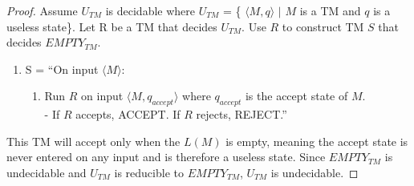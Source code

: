 \documentclass{article}
\begin{document}
\begin{proof}  
    Assume $U_{TM}$ is decidable where $U_{TM}$ = \{ $\langle M, q \rangle$  $|$ $M$ is a TM and $q$ is a useless state\}. Let R be a TM that decides $U_{TM}$. Use $R$ to construct TM $S$ that decides $EMPTY_{TM}$.
    \begin{enumerate}
    \item S = ``On input $\langle M \rangle$:
    \begin{enumerate} [1.]
    \item Run $R$ on input $\langle M, q_{accept} \rangle$ where $q_{accept}$ is the accept state of $M$.
    \\ - If $R$ accepts, ACCEPT. If $R$ rejects, REJECT.''
    \end{enumerate}
\end{enumerate}

This TM will accept only when the $L(M)$ is empty, meaning the accept state is never entered on any input and is therefore a useless state. Since $EMPTY_{TM}$ is undecidable and $U_{TM}$ is reducible to $EMPTY_{TM}$, $U_{TM}$ is undecidable.   

\end{proof}
 
 
    

    \begin{comment}
    \begin{proof}  
    
    Assume, $U_{TM}$ is decidable. Let R = the TM that decides $U_{TM}$.
    \\S = TM that decides $E_{TM}$
    \\Proof by contradiction\\
    $HALT_{TM}$ = \{$\langle M,W \rangle$ \;|\; M halts on W \} $U_{TM} \leq_m HALT_{TM}$
    \\-Assume $U_{TM}$ is decidable. Let R = decider for $U_{TM}$
    \\-Construct S that decides $HALT_{TM} using R$.
    S=``On input $\langle M,W \rangle$:
    \begin{enumerate}
    \item Run R n $\langle M, q_{accept} \rangle$ $q_{accept} \in S$
    \\-If R accepts, S accepts
    \\-If R rejects, Reject"
    \end{enumerate}
    Because $U_{TM}$ is reducible to $HALT_{TM}$,  and $HALT_{TM}$ is undecidable, $U_{TM} is undecidable$.
    \end{proof}
    -------------------------------------------
    \end{comment}
    
\end{document}
